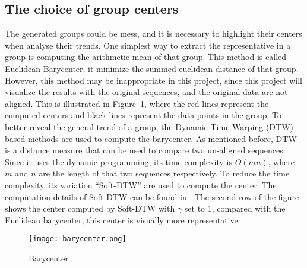 \subsection{The choice of group centers}
The generated groups could be mess, and it is necessary to highlight their centers when analyse their trends. One simplest way to extract the representative in a group is computing the arithmetic mean of that group. This method is called Euclidean Barycenter, it minimize the summed euclidean distance of that group. However, this method may be inappropriate in this project, since this project will visualize the results with the original sequences, and the original data are not aligned. This is illustrated in Figure~\ref{fig:barycenter1}, where the red lines represent the computed centers and black lines represent the data points in the group. To better reveal the general trend of a group, the Dynamic Time Warping (DTW) based methods are used to compute the barycenter. As mentioned before, DTW is a distance measure that can be used to compare two un-aligned sequences. Since it uses the dynamic programming, its time complexity is $O(mn)$, where $m$ and $n$ are the length of that two sequences respectively. To reduce the time complexity, its variation ``Soft-DTW'' are used to compute the center. The computation details of Soft-DTW can be found in \cite{schultz2018nonsmooth}. The second row of the figure shows the center computed by Soft-DTW with $\gamma$ set to 1, compared with the Euclidean barycenter, this center is visually more representative. 
\begin{figure}[!htbp]
    \centering
    \texttt{[image: barycenter.png]}
    \caption{Barycenter}
    \label{fig:barycenter1}
\end{figure} 


